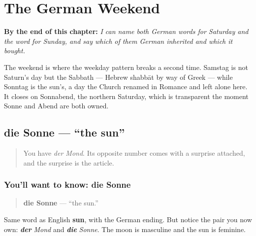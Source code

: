 
\chapter{The German Weekend}
\label{ch:ge-wochenende}

\begin{chapteropening}
\textbf{By the end of this chapter:} \emph{I can name both German words for Saturday and the word for Sunday, and say which of them German inherited and which it bought.}

The weekend is where the weekday pattern breaks a second time. Samstag is not Saturn's day but the Sabbath — Hebrew shabbāt by way of Greek — while Sonntag is the sun's, a day the Church renamed in Romance and left alone here. It closes on Sonnabend, the northern Saturday, which is transparent the moment Sonne and Abend are both owned.
\end{chapteropening}

\section[die Sonne]{die Sonne — \textquotedblleft{}the sun\textquotedblright{}}

\label{lesson:GE-C07-sonne}



\begin{quote}
You have \emph{der Mond}. Its opposite number comes with a surprise attached, and the surprise is the article.
\end{quote}

\subsection*{You'll want to know: die Sonne}
\begin{quote}
\textbf{die Sonne} — \textquotedblleft{}the sun.\textquotedblright{}
\end{quote}

Same word as English \textbf{sun}, with the German ending. But notice the pair you now own: \emph{\textbf{der}} \emph{Mond} and \emph{\textbf{die}} \emph{Sonne}. The moon is masculine and the sun is feminine.


